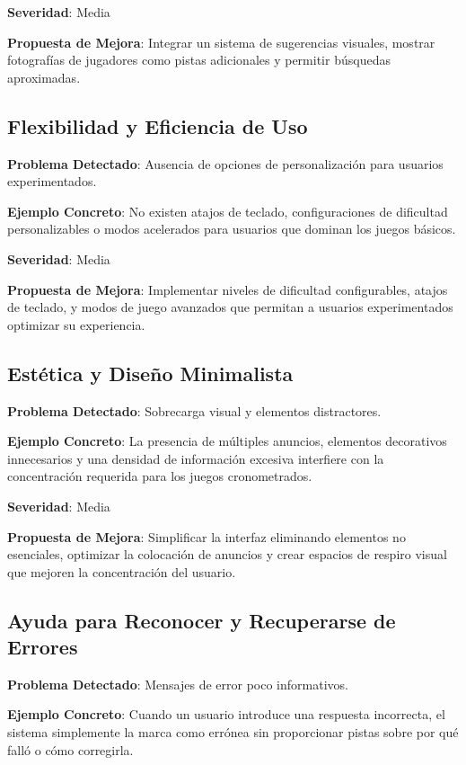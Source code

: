 \documentclass{article}
\begin{document}
	\noindent
	\textbf{Severidad}: Media
	
	\noindent
	\textbf{Propuesta de Mejora}: Integrar un sistema de sugerencias visuales, mostrar fotografías de jugadores como pistas adicionales y permitir búsquedas aproximadas.

	\subsection{Flexibilidad y Eficiencia de Uso}
	\noindent
	\textbf{Problema Detectado}: Ausencia de opciones de personalización para usuarios experimentados.
	
	\noindent
	\textbf{Ejemplo Concreto}: No existen atajos de teclado, configuraciones de dificultad personalizables o modos acelerados para usuarios que dominan los juegos básicos.
	
	\noindent
	\textbf{Severidad}: Media
	
	\noindent
	\textbf{Propuesta de Mejora}: Implementar niveles de dificultad configurables, atajos de teclado, y modos de juego avanzados que permitan a usuarios experimentados optimizar su experiencia.

	\subsection{Estética y Diseño Minimalista}
	\noindent
	\textbf{Problema Detectado}: Sobrecarga visual y elementos distractores.
	
	\noindent
	\textbf{Ejemplo Concreto}: La presencia de múltiples anuncios, elementos decorativos innecesarios y una densidad de información excesiva interfiere con la concentración requerida para los juegos cronometrados.
	
	\noindent
	\textbf{Severidad}: Media
	
	\noindent
	\textbf{Propuesta de Mejora}: Simplificar la interfaz eliminando elementos no esenciales, optimizar la colocación de anuncios y crear espacios de respiro visual que mejoren la concentración del usuario.

	\subsection{Ayuda para Reconocer y Recuperarse de Errores}
	\noindent
	\textbf{Problema Detectado}: Mensajes de error poco informativos.
	
	\noindent
	\textbf{Ejemplo Concreto}: Cuando un usuario introduce una respuesta incorrecta, el sistema simplemente la marca como errónea sin proporcionar pistas sobre por qué falló o cómo corregirla.
	
\end{document}
